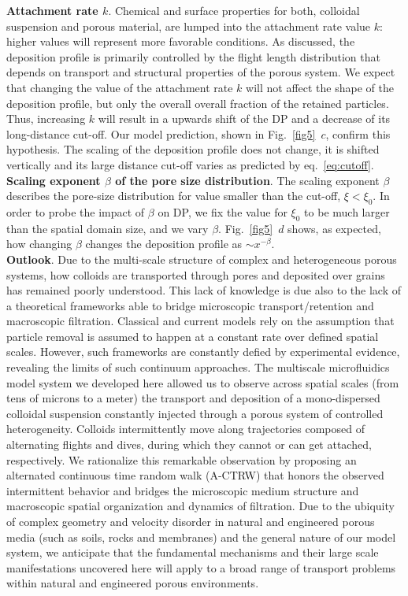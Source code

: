 \documentclass[singlecolumn,pre,notitlepage,preprintnumbers,floatfix,superscriptaddress]{revtex4-1}
\begin{document}
\noindent
\textbf{Attachment rate $k$}.
Chemical and surface properties for both, colloidal suspension and porous material, are lumped into the attachment rate value $k$: higher values will represent more favorable conditions. As discussed, the deposition profile is primarily controlled by the flight length distribution that depends on transport and structural properties of the porous system. We expect that changing the value of the attachment rate $k$ will not affect the shape of the deposition profile, but only the overall overall fraction of the retained particles. Thus, increasing $k$ will result in a upwards shift of the DP and a decrease of its long-distance cut-off. Our model prediction, shown in Fig.~\ref{fig5}~$c$, confirm this hypothesis. The scaling of the deposition profile does not change, it is shifted vertically and its large distance cut-off varies as predicted by eq.~\eqref{eq:cutoff}.\\

\noindent
\textbf{Scaling exponent $\beta$ of the pore size distribution}.
The scaling exponent $\beta$ describes the pore-size distribution for value smaller than the cut-off, $\xi < \xi_0$. In order to probe the impact of $\beta$ on DP, we fix the value for $\xi_0$ to be much larger than the spatial domain size, and we vary $\beta$. Fig.~\ref{fig5}~$d$ shows, as expected, how changing $\beta$ changes the deposition profile as $\sim x^{-\beta}$. \\

\noindent
\textbf{Outlook}. Due to the multi-scale structure of complex and heterogeneous porous systems, how colloids are transported through pores and deposited over grains has remained poorly understood. This lack of knowledge is due also to the lack of a theoretical frameworks able to bridge microscopic transport/retention and macroscopic filtration. Classical and current models rely on the assumption that particle removal is assumed to happen at a constant rate over defined spatial scales. However, such frameworks are constantly defied by experimental evidence, revealing the limits of such continuum approaches. The multiscale microfluidics model system we developed here allowed us to observe across spatial scales (from tens of microns to a meter) the transport and deposition of a mono-dispersed colloidal suspension constantly injected through a porous system of controlled heterogeneity. Colloids intermittently move along trajectories composed of alternating flights and dives, during which they cannot or can get attached, respectively. We rationalize this remarkable observation by proposing an alternated continuous time random walk (A-CTRW) that honors the observed intermittent behavior and bridges the microscopic medium structure and macroscopic spatial organization and dynamics of filtration. Due to the ubiquity of complex geometry and velocity disorder in natural and engineered porous media (such as soils, rocks and membranes) and the general nature of our model system, we anticipate that the fundamental mechanisms and their large scale manifestations uncovered here will apply to a broad range of transport problems within natural and engineered porous environments.
\end{document}
